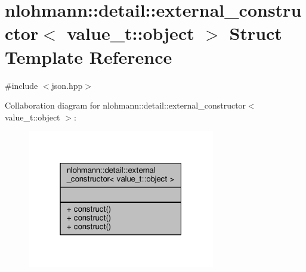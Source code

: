 \hypertarget{structnlohmann_1_1detail_1_1external__constructor_3_01value__t_1_1object_01_4}{}\section{nlohmann\+:\+:detail\+:\+:external\+\_\+constructor$<$ value\+\_\+t\+:\+:object $>$ Struct Template Reference}
\label{structnlohmann_1_1detail_1_1external__constructor_3_01value__t_1_1object_01_4}


{\ttfamily \#include $<$json.\+hpp$>$}



Collaboration diagram for nlohmann\+:\+:detail\+:\+:external\+\_\+constructor$<$ value\+\_\+t\+:\+:object $>$\+:
\nopagebreak
\begin{figure}[H]
\begin{center}
\leavevmode
\includegraphics[width=232pt]{structnlohmann_1_1detail_1_1external__constructor_3_01value__t_1_1object_01_4__coll__graph}
\end{center}
\end{figure}
